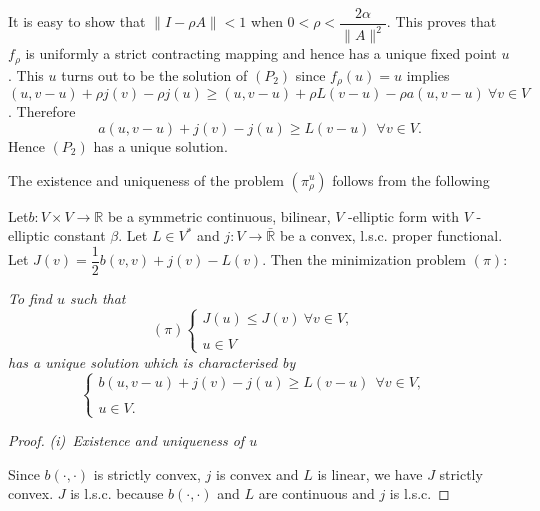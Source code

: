 It is easy to show that $\parallel I - \rho A \parallel < 1$ when $0 <
\rho < \dfrac{2 \alpha}{\parallel A \parallel^2}$. This proves that
$f_\rho$ is uniformly a strict contracting mapping and hence has a
unique fixed point $u$. This $u$ turns out to be the solution of
$(P_2)$ since $f_\rho(u) = u$ implies $(u, v - u) + \rho j(v) - \rho
j(u) \geq (u, v - u) + \rho L(v - u) - \rho a(u, v - u) ~ \forall v
\in V$. Therefore  
\begin{equation}
a(u, v - u) + j(v) - j(u) \geq L(v - u) ~~ \forall v \in
V. \tag{4.9}\label{c1:eq4.9} 
\end{equation}
Hence $(P_2)$ has a unique solution.

The existence and uniqueness of the problem $(\pi^u_\rho)$ follows
from the following  

\begin{lemma}\label{c1:lem4.1}%
Let\pageoriginale $b : V \times V \to \mathbb{R}$ be a symmetric continuous,
bilinear, $V$ -elliptic form with $V$ -elliptic constant $\beta$. Let
$L \in V^*$ and $j : V \to \bar{\mathbb{R}}$ be a convex,
l.s.c. proper functional. Let $J(v) = \dfrac{1}{2}b (v, v) + j(v)-
L(v)$. Then the minimization problem $(\pi)$:  

{\em To find $u$ such that}
\begin{equation*}
(\pi) 
\begin{cases}
J(u) \leq J(v)\ \forall v \in V,\\
&\\
u \in V
\end{cases}
\end{equation*}
{\em has a unique solution which is characterised by}
\begin{equation}
\begin{cases}
b(u, v - u) +j(v) -j(u) \geq L(v - u) ~~\forall v \in V,\\
&\\
u \in V.
\end{cases}\tag{4.10}\label{c1:eq4.10}
\end{equation}
\end{lemma}

\begin{proof}
{\em (i)~Existence and uniqueness of $u$}

Since $b(\cdot , \cdot)$ is strictly convex, $j$ is convex and $L$ is
linear, 
we have $J$ strictly convex. $J$ is l.s.c. because $b(\cdot , \cdot)$
and $L$ 
are continuous and $j$ is l.s.c. 
\end{proof}

